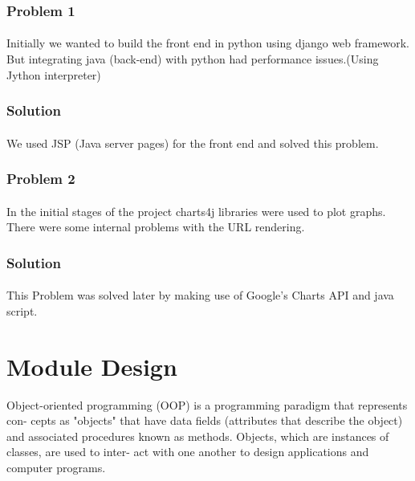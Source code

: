 \documentclass[12pt]{report}
\begin{document}
\subsubsection{Problem 1}
\paragraph{}Initially we wanted to build the front end in python using django web framework. But integrating java (back-end) with python had performance issues.(Using Jython interpreter)
\subsubsection{Solution}
\paragraph{}We used JSP (Java server pages) for the front end and solved this problem.
\subsubsection{Problem 2}
\paragraph{}In the initial stages of the project charts4j libraries were used to plot graphs. There were some internal problems with the URL rendering.

\subsubsection{Solution}
\paragraph{}This Problem was solved later by making use of Google's Charts API and java script. 


\section{Module Design}

Object-oriented programming (OOP) is a programming paradigm that represents con-
cepts as "objects" that have data fields (attributes that describe the object) and associated
procedures known as methods. Objects, which are instances of classes, are used to inter-
act with one another to design applications and computer programs.
\end{document}
